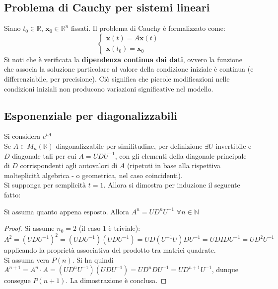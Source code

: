 \documentclass[10pt, oneside]{book}
\theoremstyle{plain}
\begin{document}
\subsection{Problema di Cauchy per sistemi lineari}
Siano $t_0 \in \mathbb{R}$, $\mathbf{x}_0 \in \mathbb{R}^n$ fissati. Il problema di Cauchy è formalizzato come:
\[\begin{cases}
\dot{\mathbf{x}}(t) = A \mathbf{x}(t)\\
\mathbf{x}(t_0) = \mathbf{x}_0
\end{cases}\]
Si noti che è verificata la \textbf{dipendenza continua dai dati}, ovvero la funzione che associa la soluzione particolare al valore della condizione iniziale è continua (e differenziabile, per precisione). Ciò significa che piccole modificazioni nelle condizioni iniziali non producono variazioni significative nel modello.

\subsection{Esponenziale per diagonalizzabili}
Si considera $e^{\displaystyle tA}$
\\Se $A \in M_n(\mathbb{R})$ diagonalizzabile per similitudine, per definizione $\exists U$ invertibile e $D$ diagonale tali per cui $A = U D U^{-1}$, con gli elementi della diagonale principale di $D$ corrispondenti agli autovalori di $A$ (ripetuti in base alla rispettiva molteplicità algebrica - o geometrica, nel caso coincidenti).
\\Si supponga per semplicità $t=1$. Allora si dimostra per induzione il seguente fatto:
\begin{prop}
Si assuma quanto appena esposto. Allora $A^n = U D^n U^{-1}$ $\forall n \in \mathbb{N}$
\end{prop}
\begin{proof}
Si assume $n_0 =2$ (il caso $1$ è triviale): $A^2 = (U D U^{-1})^2 = (U D U^{-1})(U D U^{-1}) = U D (U^{-1} U) D U^{-1} = U D I D U^{-1} = U D^2 U^{-1}$ applicando la proprietà associativa del prodotto tra matrici quadrate.
\\Si assuma vera $P(n)$. Si ha quindi $A^{n+1} = A^n \cdot A = (U D^n U^{-1}) (U D U^{-1}) = U D^n D U^{-1} = U D^{n+1} U^{-1}$, dunque consegue $P(n+1)$. La dimostrazione è conclusa.
\end{proof}
\end{document}

